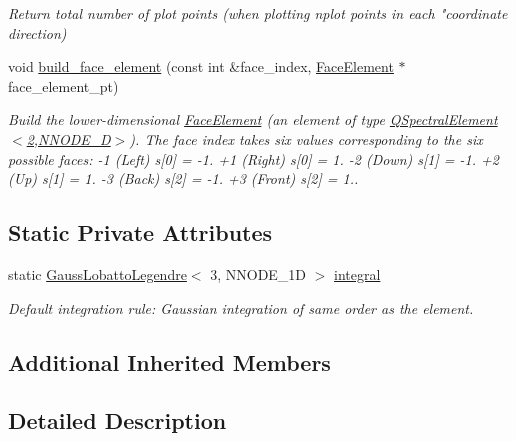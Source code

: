 \begin{DoxyCompactItemize}
\begin{DoxyCompactList}\small\item\em Return total number of plot points (when plotting nplot points in each "coordinate direction) \end{DoxyCompactList}\item 
void \hyperlink{classoomph_1_1QSpectralElement_3_013_00_01NNODE__1D_01_4_a9e7972fdef1be6a698b2d66f1cffbbc9}{build\+\_\+face\+\_\+element} (const int \&face\+\_\+index, \hyperlink{classoomph_1_1FaceElement}{Face\+Element} $\ast$face\+\_\+element\+\_\+pt)
\begin{DoxyCompactList}\small\item\em Build the lower-\/dimensional \hyperlink{classoomph_1_1FaceElement}{Face\+Element} (an element of type \hyperlink{classoomph_1_1QSpectralElement_3_012_00_01NNODE__1D_01_4}{Q\+Spectral\+Element$<$2,\+N\+N\+O\+D\+E\+\_\+D$>$}). The face index takes six values corresponding to the six possible faces\+: -\/1 (Left) s\mbox{[}0\mbox{]} = -\/1. +1 (Right) s\mbox{[}0\mbox{]} = 1. -\/2 (Down) s\mbox{[}1\mbox{]} = -\/1. +2 (Up) s\mbox{[}1\mbox{]} = 1. -\/3 (Back) s\mbox{[}2\mbox{]} = -\/1. +3 (Front) s\mbox{[}2\mbox{]} = 1.. \end{DoxyCompactList}\end{DoxyCompactItemize}
\subsection*{Static Private Attributes}
\begin{DoxyCompactItemize}
\item 
static \hyperlink{classoomph_1_1GaussLobattoLegendre}{Gauss\+Lobatto\+Legendre}$<$ 3, N\+N\+O\+D\+E\+\_\+1D $>$ \hyperlink{classoomph_1_1QSpectralElement_3_013_00_01NNODE__1D_01_4_a90bf1c3ae2ebd7b1cb81d5fa0370c532}{integral}
\begin{DoxyCompactList}\small\item\em Default integration rule\+: Gaussian integration of same \textquotesingle{}order\textquotesingle{} as the element. \end{DoxyCompactList}\end{DoxyCompactItemize}
\subsection*{Additional Inherited Members}


\subsection{Detailed Description}
